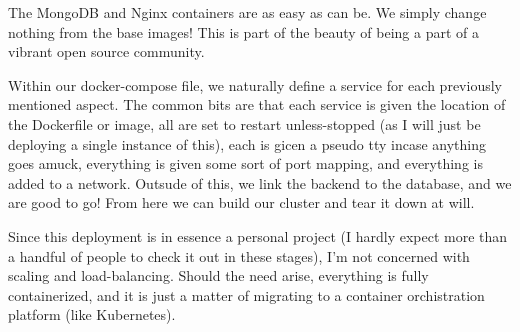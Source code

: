 \documentclass[11pt, twoside, reqno]{book}
\begin{document}
\label{Mongo and Nginx}

The MongoDB and Nginx containers are as easy as can be. We simply change nothing from the base images! This is part of the beauty of being a part of a vibrant open source community.

\label{The Composition}

Within our docker-compose file, we naturally define a service for each previously mentioned aspect. The common bits are that each service is given the location of the Dockerfile or image, all are set to restart unless-stopped (as I will just be deploying a single instance of this), each is gicen a pseudo tty incase anything goes amuck, everything is given some sort of port mapping, and everything is added to a network. Outsude of this, we link the backend to the database, and we are good to go! From here we can build our cluster and tear it down at will.

Since this deployment is in essence a personal project (I hardly expect more than a handful of people to check it out in these stages), I'm not concerned with scaling and load-balancing. Should the need arise, everything is fully containerized, and it is just a matter of migrating to a container orchistration platform (like Kubernetes).
\end{document}
